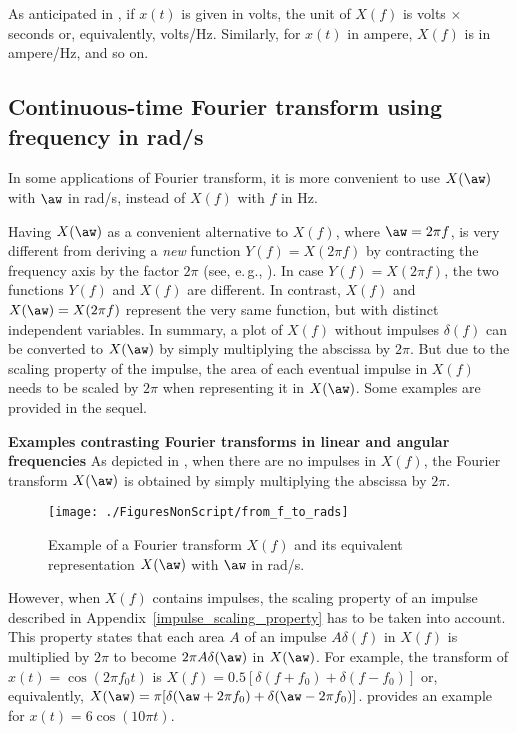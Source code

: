 As anticipated in , if $x(t)$ is given in volts, the unit of $X(f)$ is volts $\times$ seconds or, equivalently, volts/Hz. Similarly, for $x(t)$ in ampere, $X(f)$ is in ampere/Hz, and so on.

\subsection{Continuous-time Fourier transform using frequency in rad/s}
\label{sec:ctft_in_rads}

In some applications of Fourier transform, it is more convenient to use $X(\aw)$ with $\aw$ in rad/s, instead of $X(f)$ with $f$ in Hz.

Having $X(\aw)$ as a convenient alternative to $X(f)$, where $\aw=2 \pi f$, is very different from deriving a \emph{new} function $Y(f)=X(2 \pi f)$ by contracting the frequency axis by the factor $2 \pi$ (see, e.\,g., ).
In case $Y(f)=X(2 \pi f)$, the two functions $Y(f)$ and $X(f)$ are different. In contrast, 
$X(f)$ and $X(\aw)=X(2 \pi f)$ represent the very same function, but with distinct independent variables. In summary, a plot of $X(f)$ without impulses $\delta(f)$ can be converted to $X(\aw)$ by simply multiplying the abscissa by $2 \pi$. 
But due to the scaling property of the impulse, the area of each eventual impulse in $X(f)$ needs to be scaled by
$2 \pi$ when representing it in $X(\aw)$. Some examples are provided in the sequel.

\bExample \textbf{Examples contrasting Fourier transforms in linear and angular frequencies}
As depicted in , when there are no impulses in $X(f)$, the Fourier transform $X(\aw)$
is obtained by simply multiplying the abscissa by $2 \pi$. 

\begin{figure}[htbp]
\centering
\texttt{[image: ./FiguresNonScript/from\_f\_to\_rads]}
\caption{Example of a Fourier transform $X(f)$ and its equivalent representation
$X(\aw)$ with $\aw$ in rad/s.\label{fig:from_f_to_rads}}
\end{figure}

However, when $X(f)$ contains impulses, the scaling property of an impulse described in Appendix~\ref{impulse_scaling_property} has to be taken into account. This property states that each area $A$ of an impulse $A\delta(f)$ in $X(f)$ is multiplied by $2\pi$ to become $2\pi A \delta(\aw)$ in $X(\aw)$. For example, the transform of $x(t)=\cos(2\pi f_0 t)$ is $X(f)=0.5[\delta(f+f_0)+\delta(f-f_0)]$ or, equivalently, $X(\aw)=\pi[\delta(\aw+2 \pi f_0)+\delta(\aw-2 \pi f_0)]$.  provides an example for $x(t)=6 \cos(10 \pi  t)$.


